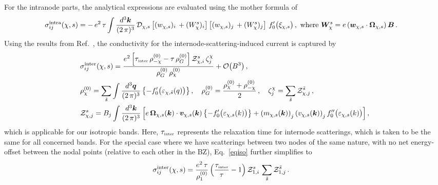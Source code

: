 \documentclass[aps,prb,onecolumn,nofootinbib,citeautoscript,10pt]{revtex4-2}
\def \nn{\nonumber \\}
\begin{document}
For the intranode parts, the analytical expressions are evaluated using the mother formula of
\cite{ips-rsw-ph, ips-spin1-ph}
\begin{align}
\label{eqsig}
   \sigma^{\rm intra}_{i j} (\chi, s)
&= - \,e^2 \, \tau  
\int \frac{ d^3 \boldsymbol k}{(2\, \pi)^3 } \, \mathcal{D}_{\chi,s} 
\left[  (w_{\chi,s})_i \, + (W_\chi^s)_i \right ]
\left [ (w_{\chi,s})_j \, + (W_\chi^s)_j \right] \,
f^\prime_0 \big (\xi_{\chi,s} \big )  \,,
\text{ where }
\boldsymbol{W}_\chi^s 
= e \left  ( {\boldsymbol w}_{\chi,s} \cdot 
  \boldsymbol {\Omega}_{\chi,s} \right  ) \boldsymbol{B}\,.
\end{align}
Using the results from Ref.~\cite{ips-internode}, the conductivity for the internode-scattering-induced current is captured by
\begin{align}
\label{eqiso}
& \sigma^{\rm inter }_{ij} (\chi, s) = 
\frac {e^2  
\left [  \tau_{\text{\tiny{inter}}}  \, \rho_{-\chi}^{(0)} 
- \tau \, \rho_G^{(0)} \right ]
 \mathcal{Z}_{\chi, i}^s \, \zeta^\chi_j   }
 { \rho_G^{(0)} \, \rho_\chi^{(0)} } 
 + \order{B^3} \,,
\nn & \rho_\chi^{(0)} =
 \sum \limits_{ \tilde s }
\int \frac{ d^3 \boldsymbol q}  {(2\, \pi)^3 } 
 \left \lbrace  - f_0^\prime 
 \big (\varepsilon_{  \chi, \tilde s }  (q) \big)  \right \rbrace ,\quad
\rho_G^{(0)} = 
\frac{ \rho_\chi^{(0)} + \rho_{-\chi}^{(0)} }  {2}   \,, 
\quad \zeta^\chi_j  = 
 \sum_{\tilde s}  \mathcal{Z}_{\chi, j }^{\tilde s}  \,,
\nn &  \mathcal{Z}_{\chi, j}^s
=   B_j \int
\frac{ d^3 \boldsymbol k} {(2\, \pi)^3 } 
\left [
 e \, {\boldsymbol \Omega}_{\chi,s} (\boldsymbol k) 
 \cdot  {\boldsymbol   v}_{\chi, s} (\boldsymbol k) 
\left \lbrace - 
 f_0^\prime \big (\varepsilon_{\chi, s} (k) \big)  
 \right  \rbrace
+
  \left ( m_{\chi, s} (\boldsymbol k) \right)_j  
  \left (  v_{\chi ,s} (\boldsymbol k) \right)_j
f_0^{\prime \prime} \big (\varepsilon_{\chi,s} (k)  \big) 
\right ] ,
\end{align}
which is applicable for our isotropic bands. Here, $  \tau_{\text{\tiny{inter}}}  $ represents the relaxation time for internode scatterings, which is taken to be the same for all concerned bands. For the special case where we have scatterings between two nodes of the same nature, with no net energy-offset between the nodal points (relative to each other in the BZ), Eq.~\eqref{eqiso} further simplifies to~\cite{ips-internode}
\begin{align}
\label{eqsamenode}
 \sigma^{\rm inter }_{ij} (\chi, s)
 & =
 \frac { e^2   \, \tau  }{ \rho_1^{(0)} } 
  \left(\frac{ \tau_{\text{\tiny{inter}}} }{\tau }-1\right)
 \mathcal{Z}^{s}_{1,i} \, \sum \limits_{\tilde s} \mathcal{Z}^{\tilde s}_{1,j}\,.
\end{align}
\end{document}
